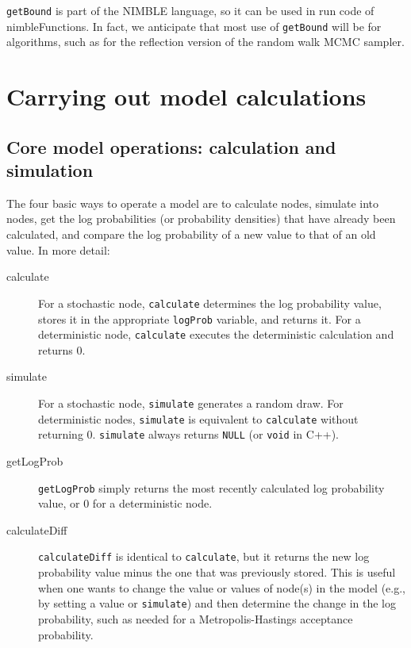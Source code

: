 \documentclass[12pt,oneside]{book}\usepackage[]{graphicx}\usepackage[]{color}
\def\cd#1{\texttt{#1}}
\begin{document}
\cd{getBound} is part of the NIMBLE language, so it can be used in run code of nimbleFunctions. In fact, we anticipate that
most use of \cd{getBound} will be for algorithms, such as for the reflection
version of the random walk MCMC sampler.




\section{Carrying out model calculations}
\label{sec:cdcalc-cdsim-cdgetl}


\subsection{Core model operations: calculation and simulation}

The four basic ways to operate a model are to calculate nodes,
simulate into nodes, get the log probabilities (or probability
densities) that have already been calculated, and compare the log probability
of a new value to that of an old value.  In more detail:

\begin{description}
\item[calculate] For a stochastic node,
\cd{calculate} determines the log probability value, stores it in the
appropriate \cd{logProb} variable, and
returns it.  For a deterministic node, \cd{calculate} executes the
deterministic calculation and returns 0.
\item[simulate] For a stochastic node, \cd{simulate} generates a
  random draw.  For deterministic nodes,
\cd{simulate} is equivalent to \cd{calculate} without returning
0. \cd{simulate} always returns \cd{NULL} (or \cd{void} in C++).
\item[getLogProb]   \cd{getLogProb} simply
returns the most recently calculated log probability value, or 0 for a
deterministic node.
\item[calculateDiff]  \cd{calculateDiff} is identical to
  \cd{calculate}, but it returns the new log probability value minus
  the one that was previously stored. This is useful when one wants to
  change the value or values of node(s) in the model (e.g., by setting a value or 
  \cd{simulate}) and then determine
  the change in the log probability, such as needed for a
  Metropolis-Hastings acceptance probability. 
\end{description}
\end{document}
